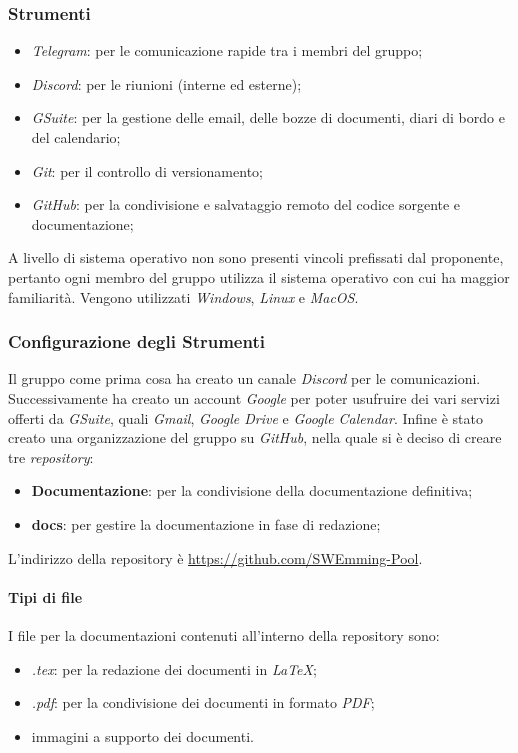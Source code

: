         \subsubsection{Strumenti}
            \begin{itemize}
                \item \textit{Telegram}: per le comunicazione rapide tra i membri del gruppo;
                \item \textit{Discord}: per le riunioni (interne ed esterne);
                \item \textit{GSuite}: per la gestione delle email, delle bozze di documenti, diari di bordo e del calendario;
                \item \textit{Git}: per il controllo di versionamento;
                \item \textit{GitHub}: per la condivisione e salvataggio remoto del codice sorgente e documentazione;
            \end{itemize}
            
            A livello di sistema operativo non sono presenti vincoli prefissati dal proponente, pertanto ogni membro del gruppo utilizza il sistema operativo con cui ha maggior familiarità.
            Vengono utilizzati \textit{Windows}, \textit{Linux} e \textit{MacOS}.

        \subsubsection{Configurazione degli Strumenti}
            Il gruppo come prima cosa ha creato un canale \textit{Discord} per le comunicazioni.
            Successivamente ha creato un account \textit{Google} per poter usufruire dei vari servizi offerti da \textit{GSuite}, quali \textit{Gmail}, \textit{Google Drive} e \textit{Google Calendar}.
            Infine è stato creato una organizzazione del gruppo su \textit{GitHub}, nella quale si è deciso di creare tre \textit{repository}:
                \begin{itemize}
                    \item \textbf{Documentazione}: per la condivisione della documentazione definitiva;
                    \item \textbf{docs}: per gestire la documentazione in fase di redazione;
                \end{itemize}
            L'indirizzo della repository è \href{https://github.com/SWEmming-Pool}{https://github.com/SWEmming-Pool}.
        \paragraph{Tipi di file}
        I file per la documentazioni contenuti all'interno della repository sono:
        \begin{itemize}
            \item \textit{.tex}: per la redazione dei documenti in \textit{LaTeX};
            \item \textit{.pdf}: per la condivisione dei documenti in formato \textit{PDF};
            \item immagini a supporto dei documenti.
        \end{itemize}

